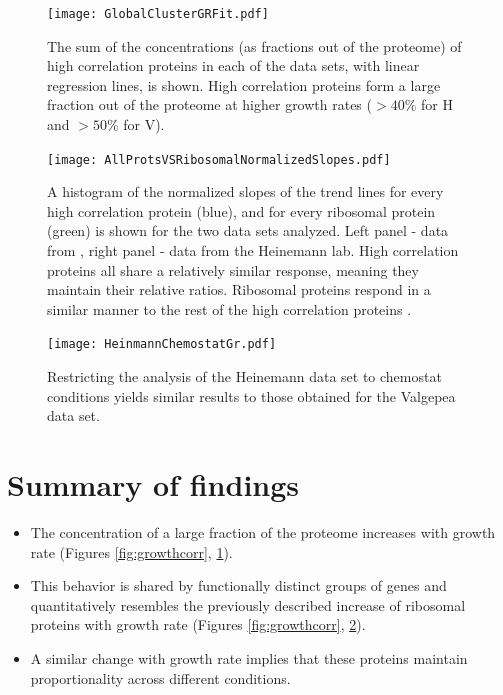 \documentclass[a4paper,landscape,titlepage,17pt]{extarticle}
\begin{document}
\begin{figure}[h]
\centering
\texttt{[image: GlobalClusterGRFit.pdf]}
\caption{\linespread{0.5}\selectfont{}
The sum of the concentrations (as fractions out of the proteome) of high correlation proteins in each of the data sets, with linear regression lines, is shown.
High correlation proteins form a large fraction out of the proteome at higher growth rates ($>40\%$ for H and $>50\%$ for V).
}

\label{fig:globalgrcorr}
\end{figure}
\clearpage        
\begin{figure}[h]
\centering
\texttt{[image: AllProtsVSRibosomalNormalizedSlopes.pdf]}
\caption{\linespread{0.5}\selectfont{}
    A histogram of the normalized slopes of the trend lines for every high correlation protein (blue), and for every ribosomal protein (green) is shown for the two data sets analyzed.
    Left panel - data from \parencite{Valgepea2013}, right panel - data from the Heinemann lab.
    High correlation proteins all share a relatively similar response, meaning they maintain their relative ratios.
    Ribosomal proteins respond in a similar manner to the rest of the high correlation proteins .
}
\label{fig:globalfit}
\end{figure}
\clearpage        

\begin{figure}[h]
\centering
\texttt{[image: HeinmannChemostatGr.pdf]}
\caption{\linespread{0.5}\selectfont{}
  Restricting the analysis of the Heinemann data set to chemostat conditions yields similar results to those obtained for the Valgepea data set.
}
\label{fig:growthcorrchemo}
\end{figure}
\clearpage        

\section*{Summary of findings}
\begin{itemize}
\item The concentration of a large fraction of the proteome increases with growth rate (Figures \ref{fig:growthcorr}, \ref{fig:globalgrcorr}).
\item This behavior is shared by functionally distinct groups of genes and quantitatively resembles the previously described increase of ribosomal proteins with growth rate (Figures \ref{fig:growthcorr}, \ref{fig:globalfit}).
\item A similar change with growth rate implies that these proteins maintain proportionality across different conditions.
\end{itemize}
\end{document}
